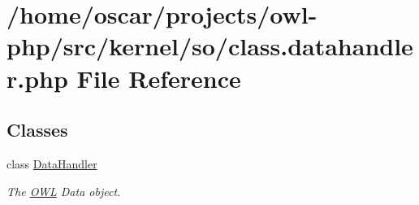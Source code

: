 \section{/home/oscar/projects/owl-\/php/src/kernel/so/class.datahandler.php File Reference}
\label{class_8datahandler_8php}
\subsection*{Classes}
\begin{DoxyCompactItemize}
\item 
class \hyperlink{classDataHandler}{DataHandler}
\begin{DoxyCompactList}\small\item\em The \hyperlink{classOWL}{OWL} Data object. \item\end{DoxyCompactList}\end{DoxyCompactItemize}
